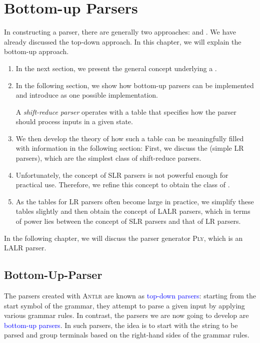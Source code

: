 \chapter{Bottom-up Parsers\label{chapter:bottom-up}}
In constructing a parser, there are generally two approaches:  and . We have already discussed the top-down approach. In this chapter, we will explain the bottom-up approach.
\begin{enumerate}
\item In the next section, we present the general concept underlying a
      .
\item In the following section, we show how bottom-up parsers can be implemented and introduce
       as one possible implementation. 

      A \emph{shift-reduce parser} operates with a table that specifies how the parser should process inputs in
      a given state. 
\item We then develop the theory of how such a table can be meaningfully filled with information in the
      following section: First, we discuss the  (simple LR parsers), which are the simplest
      class of shift-reduce parsers. 
\item Unfortunately, the concept of SLR parsers is not powerful enough for practical use. Therefore, we refine
      this concept to obtain the class of .
\item As the tables for LR parsers often become large in practice, we simplify these tables slightly and
      then obtain the concept of LALR parsers, which in terms of power lies between the concept of
      SLR parsers and that of LR parsers.
\end{enumerate}
In the following chapter, we will discuss the parser generator \textsc{Ply}, which is an LALR parser.


\section{Bottom-Up-Parser}
The parsers created with \textsc{Antlr} are known as \textcolor{blue}{top-down parsers}: starting from the start symbol of the grammar, they attempt to parse a given input by applying various grammar rules. In contrast, the parsers we are now going to develop are \textcolor{blue}{bottom-up parsers}. In such parsers, the idea is to start with the string to be parsed and group terminals based on the right-hand sides of the grammar rules.

